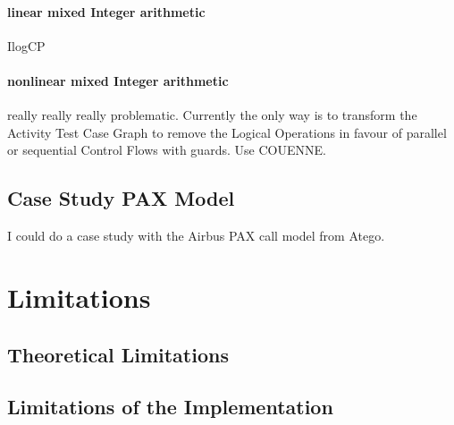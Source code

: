 \paragraph{linear mixed Integer arithmetic} IlogCP
\paragraph{nonlinear mixed Integer arithmetic}
really really really problematic. Currently the only way is to transform the Activity Test Case Graph to remove the Logical Operations in favour of parallel or sequential Control Flows with guards. Use COUENNE.
\subsection{Case Study PAX Model}
I could do a case study with the Airbus PAX call model from Atego.
\section{Limitations}
\subsection{Theoretical Limitations}
\subsection{Limitations of the Implementation}


